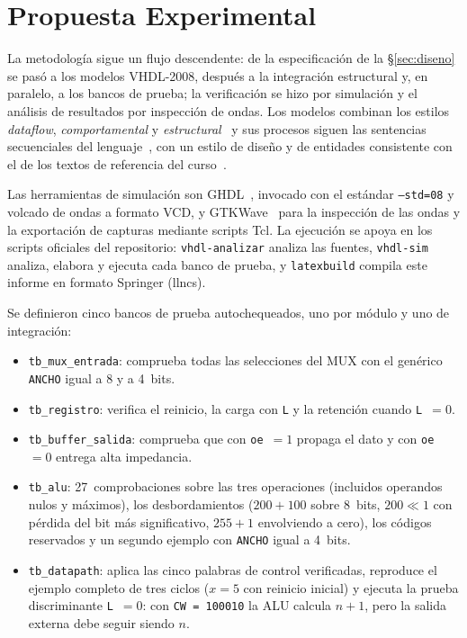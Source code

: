 \documentclass[llncs]{llncs}
\begin{document}
\section{Propuesta Experimental}
\label{sec:propuesta}

La metodología sigue un flujo descendente: de la especificación de la
§\ref{sec:diseno} se pasó a los modelos VHDL-2008, después a la
integración estructural y, en paralelo, a los bancos de prueba; la
verificación se hizo por simulación y el análisis de resultados por
inspección de ondas. Los modelos combinan los estilos \emph{dataflow},
\emph{comportamental} y \emph{estructural}~\cite{navabi1998vhdl} y sus
procesos siguen las sentencias secuenciales del lenguaje~\cite{ashenden2008vhdl},
con un estilo de diseño y de entidades consistente con el de los textos de
referencia del curso~\cite{harris2015ddca,ieee1076_2008}.

Las herramientas de simulación son GHDL~\cite{ghdl-docs}, invocado con el
estándar \texttt{--std=08} y volcado de ondas a formato VCD, y
GTKWave~\cite{gtkwave-docs} para la inspección de las ondas y la
exportación de capturas mediante scripts Tcl. La ejecución se apoya en los
scripts oficiales del repositorio: \texttt{vhdl-analizar} analiza las
fuentes, \texttt{vhdl-sim} analiza, elabora y ejecuta cada banco de
prueba, y \texttt{latexbuild} compila este informe en formato Springer
(llncs).

Se definieron cinco bancos de prueba autochequeados, uno por módulo y uno
de integración:

\begin{itemize}
  \item \texttt{tb\_mux\_entrada}: comprueba todas las selecciones del MUX
    con el genérico \texttt{ANCHO} igual a 8 y a 4~bits.
  \item \texttt{tb\_registro}: verifica el reinicio, la carga con
    \texttt{L} y la retención cuando \texttt{L}~$=0$.
  \item \texttt{tb\_buffer\_salida}: comprueba que con \texttt{oe}~$=1$
    propaga el dato y con \texttt{oe}~$=0$ entrega alta impedancia.
  \item \texttt{tb\_alu}: 27~comprobaciones sobre las tres operaciones
    (incluidos operandos nulos y máximos), los desbordamientos
    ($200+100$ sobre 8~bits, $200 \ll 1$ con pérdida del bit más
    significativo, $255+1$ envolviendo a cero), los códigos reservados y
    un segundo ejemplo con \texttt{ANCHO} igual a 4~bits.
  \item \texttt{tb\_datapath}: aplica las cinco palabras de control
    verificadas, reproduce el ejemplo completo de tres ciclos
    ($x=5$ con reinicio inicial) y ejecuta la prueba discriminante
    \texttt{L}~$=0$: con \texttt{CW = 100010} la ALU calcula $n+1$,
    pero la salida externa debe seguir siendo $n$.
\end{itemize}
\end{document}

